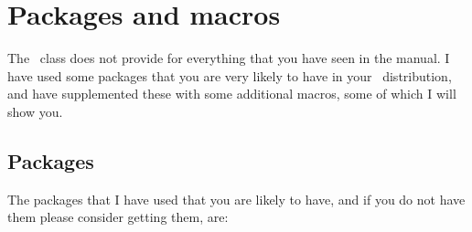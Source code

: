 \chapter{Packages and macros}

    The \Mname\ class does not provide for everything that you
have seen in the manual. I have used some packages that you are very likely
to have in your \ltx\ distribution, and have supplemented these with some
additional macros, some of which I will show you.

\section{Packages}

    The packages that I have used that you are likely to have, and if
you do  not have them please consider getting them, are:
